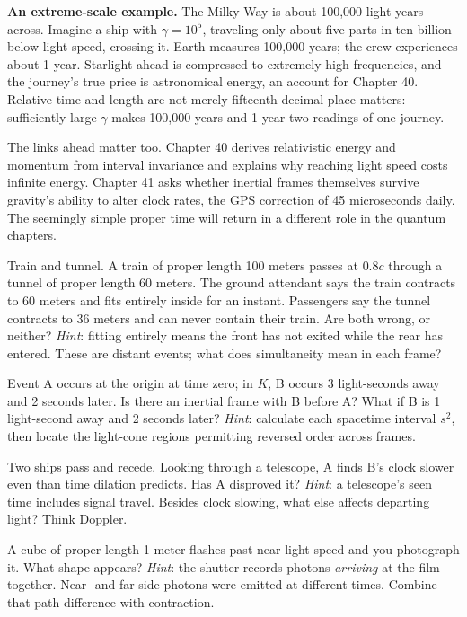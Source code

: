 \begin{mainline}
\textbf{An extreme-scale example.} The Milky Way is about 100,000 light-years across. Imagine a ship with \(\gamma=10^{5}\), traveling only about five parts in ten billion below light speed, crossing it. Earth measures 100,000 years; the crew experiences about 1 year. Starlight ahead is compressed to extremely high frequencies, and the journey's true price is astronomical energy, an account for Chapter 40. Relative time and length are not merely fifteenth-decimal-place matters: sufficiently large \(\gamma\) makes 100,000 years and 1 year two readings of one journey.

The links ahead matter too. Chapter 40 derives relativistic energy and momentum from interval invariance and explains why reaching light speed costs infinite energy. Chapter 41 asks whether inertial frames themselves survive gravity's ability to alter clock rates, the GPS correction of 45 microseconds daily. The seemingly simple proper time will return in a different role in the quantum chapters.
\end{mainline}

\begin{puzzles}
  \item Train and tunnel. A train of proper length 100 meters passes at \(0.8c\) through a tunnel of proper length 60 meters. The ground attendant says the train contracts to 60 meters and fits entirely inside for an instant. Passengers say the tunnel contracts to 36 meters and can never contain their train. Are both wrong, or neither? \emph{Hint}: fitting entirely means the front has not exited while the rear has entered. These are distant events; what does simultaneity mean in each frame?

  \item Event A occurs at the origin at time zero; in \(K\), B occurs 3 light-seconds away and 2 seconds later. Is there an inertial frame with B before A? What if B is 1 light-second away and 2 seconds later? \emph{Hint}: calculate each spacetime interval \(s^{2}\), then locate the light-cone regions permitting reversed order across frames.

  \item Two ships pass and recede. Looking through a telescope, A finds B's clock slower even than time dilation predicts. Has A disproved it? \emph{Hint}: a telescope's seen time includes signal travel. Besides clock slowing, what else affects departing light? Think Doppler.

  \item A cube of proper length 1 meter flashes past near light speed and you photograph it. What shape appears? \emph{Hint}: the shutter records photons \emph{arriving} at the film together. Near- and far-side photons were emitted at different times. Combine that path difference with contraction.
\end{puzzles}
